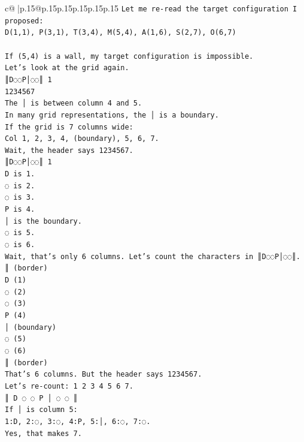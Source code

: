 \documentclass{article}
\begin{document}
{\begin{supertabular}{c@{$\;$}|p{.15\linewidth}@{}p{.15\linewidth}p{.15\linewidth}p{.15\linewidth}p{.15\linewidth}p{.15\linewidth}}
{{{\texttt{Let me re{-}read the target configuration I proposed:} \\
\texttt{D(1,1), P(3,1), T(3,4), M(5,4), A(1,6), S(2,7), O(6,7)} \\
\\ 
\texttt{If (5,4) is a wall, my target configuration is impossible.} \\
\texttt{Let's look at the grid again.} \\
\texttt{║D◌◌P│◌◌║ 1} \\
\texttt{1234567} \\
\texttt{The │ is between column 4 and 5.} \\
\texttt{In many grid representations, the │ is a boundary.} \\
\texttt{If the grid is 7 columns wide:} \\
\texttt{Col 1, 2, 3, 4, (boundary), 5, 6, 7.} \\
\texttt{Wait, the header says 1234567.} \\
\texttt{║D◌◌P│◌◌║ 1} \\
\texttt{D is 1.} \\
\texttt{◌ is 2.} \\
\texttt{◌ is 3.} \\
\texttt{P is 4.} \\
\texttt{│ is the boundary.} \\
\texttt{◌ is 5.} \\
\texttt{◌ is 6.} \\
\texttt{Wait, that's only 6 columns. Let's count the characters in ║D◌◌P│◌◌║.} \\
\texttt{║ (border)} \\
\texttt{D (1)} \\
\texttt{◌ (2)} \\
\texttt{◌ (3)} \\
\texttt{P (4)} \\
\texttt{│ (boundary)} \\
\texttt{◌ (5)} \\
\texttt{◌ (6)} \\
\texttt{║ (border)} \\
\texttt{That's 6 columns. But the header says 1234567.} \\
\texttt{Let's re{-}count: 1 2 3 4 5 6 7.} \\
\texttt{║ D ◌ ◌ P │ ◌ ◌ ║} \\
\texttt{If │ is column 5:} \\
\texttt{1:D, 2:◌, 3:◌, 4:P, 5:│, 6:◌, 7:◌.} \\
\texttt{Yes, that makes 7.} \\
}}}
\end{supertabular}}
\end{document}
